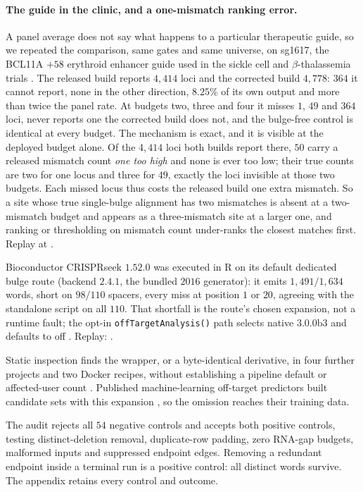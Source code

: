 \paragraph{The guide in the clinic, and a one-mismatch ranking error.}
A panel average does not say what happens to a particular therapeutic guide, so we repeated
the comparison, same gates and same universe, on sg1617, the BCL11A $+58$ erythroid enhancer
guide used in the sickle cell and $\beta$-thalassemia trials \citep{cancellieri2023variant}.
The released build reports $4{,}414$ loci and the corrected build $4{,}778$: $364$ it cannot
report, none in the other direction, $8.25\%$ of its own output and more than twice the panel
rate. At budgets two, three and four it misses $1$, $49$ and $364$ loci, never reports one the
corrected build does not, and the bulge-free control is identical at every budget. The
mechanism is exact, and it is visible at the deployed budget alone. Of the $4{,}414$ loci both
builds report there, $50$ carry a released mismatch count \emph{one too high} and none is ever
too low; their true counts are two for one locus and three for $49$, exactly the loci invisible
at those two budgets. Each missed locus thus costs the released build one extra mismatch. So a
site whose true single-bulge alignment has two mismatches is absent at a two-mismatch budget and
appears as a three-mismatch site at a larger one, and ranking or thresholding on mismatch count
under-ranks the closest matches first. Replay at .

Bioconductor CRISPRseek $1.52.0$ was executed in R on its default dedicated bulge route
(backend $2.4.1$, the bundled $2016$ generator): it emits $1{,}491/1{,}634$ words, short on
$98/110$ spacers, every miss at position $1$ or $20$, agreeing with the standalone script on
all $110$. That shortfall is the route's chosen expansion, not a runtime fault; the opt-in
\texttt{offTargetAnalysis()} path selects native $3.0.0\mathrm{b}3$ and defaults to off
\citep{crisprseek_1531_source,fieldlevel_audit_2026}. Replay:
.

Static inspection finds the wrapper, or a byte-identical derivative, in four further projects
and two Docker recipes, without establishing a pipeline default or affected-user count
\citep{fieldlevel_audit_2026}. Published machine-learning off-target predictors built candidate
sets with this expansion \citep{yaish2024bulges}, so the omission reaches their training data.

The audit rejects all $54$ negative controls and accepts both positive controls,
testing distinct-deletion removal, duplicate-row padding, zero RNA-gap budgets,
malformed inputs and suppressed endpoint edges. Removing a redundant endpoint
inside a terminal run is a positive control: all distinct words survive. The
appendix retains every control and outcome.

